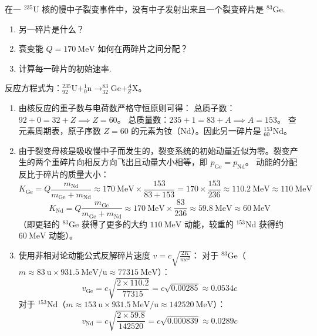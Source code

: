 \begin{exercise}\label{ex:29.31}
在一 $^{235}\mathrm{U}$ 核的慢中子裂变事件中，没有中子发射出来且一个裂变碎片是 $^{83}\mathrm{Ge}$. 
\begin{enumerate}
  \item[(a)] 另一碎片是什么？
  \item[(b)] 衰变能 $Q = 170 \ \mathrm{MeV}$ 如何在两碎片之间分配？
  \item[(c)] 计算每一碎片的初始速率.
\end{enumerate}
\end{exercise}
\begin{solution}
反应方程式为：$^{235}_{92}\mathrm{U} + ^{1}_{0}\mathrm{n} \rightarrow ^{83}_{32}\mathrm{Ge} + ^{A}_{Z}\mathrm{X}$。
\begin{enumerate}
    \item[(a)] 由核反应的重子数与电荷数严格守恒原则可得：
    总质子数：$92 + 0 = 32 + Z \implies Z = 60$。
    总质量数：$235 + 1 = 83 + A \implies A = 153$。
    查元素周期表，原子序数 $Z=60$ 的元素为钕（$\mathrm{Nd}$）。因此另一碎片是 $^{153}_{60}\mathrm{Nd}$。
    
    \item[(b)] 由于裂变母核是吸收慢中子而发生的，裂变系统的初始动量近似为零。裂变产生的两个重碎片向相反方向飞出且动量大小相等，即 $p_{\mathrm{Ge}} = p_{\mathrm{Nd}}$。
    动能的分配反比于碎片的质量大小：
    $$ K_{\mathrm{Ge}} = Q \frac{m_{\mathrm{Nd}}}{m_{\mathrm{Ge}} + m_{\mathrm{Nd}}} \approx 170 \ \mathrm{MeV} \times \frac{153}{83 + 153} = 170 \times \frac{153}{236} \approx 110.2 \ \mathrm{MeV} \approx 110 \ \mathrm{MeV} $$
    $$ K_{\mathrm{Nd}} = Q \frac{m_{\mathrm{Ge}}}{m_{\mathrm{Ge}} + m_{\mathrm{Nd}}} \approx 170 \ \mathrm{MeV} \times \frac{83}{236} \approx 59.8 \ \mathrm{MeV} \approx 60 \ \mathrm{MeV} $$
    （即更轻的 $^{83}\mathrm{Ge}$ 获得了更多的大约 $110 \ \mathrm{MeV}$ 动能，较重的 $^{153}\mathrm{Nd}$ 获得约 $60 \ \mathrm{MeV}$ 动能）。

    \item[(c)] 使用非相对论动能公式反解碎片速度 $v = c \sqrt{\frac{2K}{mc^2}}$：
    对于 $^{83}\mathrm{Ge}$（$m \approx 83 \ \mathrm{u} \times 931.5 \ \mathrm{MeV/u} \approx 77315 \ \mathrm{MeV}$）：
    $$ v_{\mathrm{Ge}} = c \sqrt{\frac{2 \times 110.2}{77315}} = c \sqrt{0.00285} \approx 0.0534 c $$
    对于 $^{153}\mathrm{Nd}$（$m \approx 153 \ \mathrm{u} \times 931.5 \ \mathrm{MeV/u} \approx 142520 \ \mathrm{MeV}$）：
    $$ v_{\mathrm{Nd}} = c \sqrt{\frac{2 \times 59.8}{142520}} = c \sqrt{0.000839} \approx 0.0289 c $$
\end{enumerate}
\end{solution}

